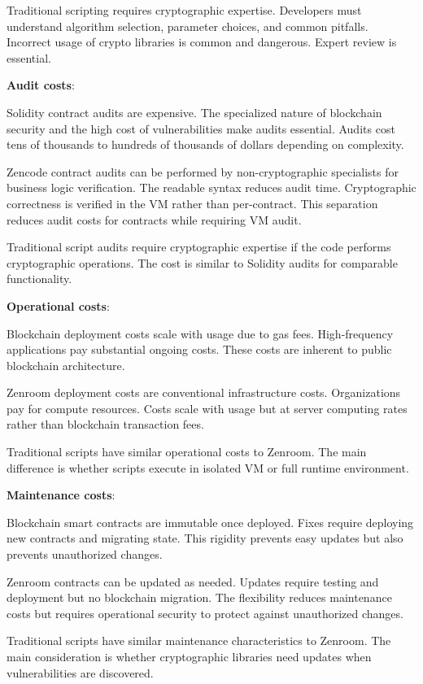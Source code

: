Traditional scripting requires cryptographic expertise. Developers
must understand algorithm selection, parameter choices, and common
pitfalls. Incorrect usage of crypto libraries is common and
dangerous. Expert review is essential.

\textbf{Audit costs}:

Solidity contract audits are expensive. The specialized nature of
blockchain security and the high cost of vulnerabilities make audits
essential. Audits cost tens of thousands to hundreds of thousands of
dollars depending on complexity.

Zencode contract audits can be performed by non-cryptographic
specialists for business logic verification. The readable syntax
reduces audit time. Cryptographic correctness is verified in the VM
rather than per-contract. This separation reduces audit costs for
contracts while requiring VM audit.

Traditional script audits require cryptographic expertise if the code
performs cryptographic operations. The cost is similar to Solidity
audits for comparable functionality.

\textbf{Operational costs}:

Blockchain deployment costs scale with usage due to gas
fees. High-frequency applications pay substantial ongoing costs. These
costs are inherent to public blockchain architecture.

Zenroom deployment costs are conventional infrastructure
costs. Organizations pay for compute resources. Costs scale with usage
but at server computing rates rather than blockchain transaction fees.

Traditional scripts have similar operational costs to Zenroom. The
main difference is whether scripts execute in isolated VM or full
runtime environment.

\textbf{Maintenance costs}:

Blockchain smart contracts are immutable once deployed. Fixes require
deploying new contracts and migrating state. This rigidity prevents
easy updates but also prevents unauthorized changes.

Zenroom contracts can be updated as needed. Updates require testing
and deployment but no blockchain migration. The flexibility reduces
maintenance costs but requires operational security to protect against
unauthorized changes.

Traditional scripts have similar maintenance characteristics to
Zenroom. The main consideration is whether cryptographic libraries
need updates when vulnerabilities are discovered.

